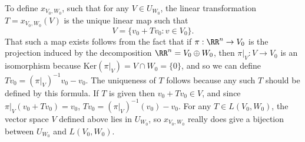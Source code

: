 To define $x_{V_0,W_0}$, such that for any $V \in U_{W_0}$, the linear transformation $T = x_{V_0,W_0}(V)$ is the unique linear map such that
%
\[ V = \{ v_0 + Tv_0 : v \in V_0 \}. \]
%
That such a map exists follows from the fact that if $\pi: \RR^n \to V_0$ is the projection induced by the decomposition $\RR^n = V_0 \oplus W_0$, then $\pi|_V: V \to V_0$ is an isomorphism because $\text{Ker}(\pi|_V) = V \cap W_0 = \{ 0 \}$, and so we can define $Tv_0 = (\pi|_V)^{-1} v_0 - v_0$. The uniqueness of $T$ follows because any such $T$ should be defined by this formula. If $T$ is given then $v_0 + Tv_0 \in V$, and since $\pi|_V(v_0 + Tv_0) = v_0$, $Tv_0 = (\pi|_V)^{-1}(v_0) - v_0$. For any $T \in L(V_0,W_0)$, the vector space $V$ defined above lies in $U_{W_0}$, so $x_{V_0,W_0}$ really does give a bijection between $U_{W_0}$ and $L(V_0,W_0)$.

